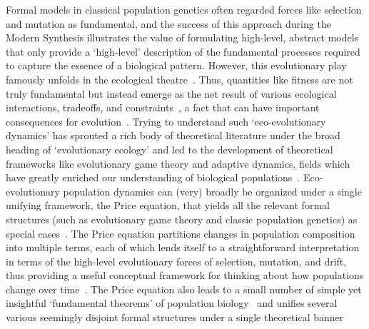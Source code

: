 Formal models in classical population genetics often regarded forces like selection and mutation as fundamental, and the success of this approach during the Modern Synthesis illustrates the value of formulating high-level, abstract models that only provide a `high-level' description of the fundamental processes required to capture the essence of a biological pattern. However, this evolutionary play famously unfolds in the ecological theatre~\citep{hutchinson_ecological_1965}. Thus, quantities like fitness are not truly fundamental but instead emerge as the net result of various ecological interactions, tradeoffs, and constraints~\citep{metz_how_1992}, a fact that can have important consequences for evolution~\citep{coulson_putting_2006, kokko_can_2017}. Trying to understand such `eco-evolutionary dynamics' has sprouted a rich body of theoretical literature under the broad heading of `evolutionary ecology' and led to the development of theoretical frameworks like evolutionary game theory and adaptive dynamics, fields which have greatly enriched our understanding of biological populations~\citep{brown_why_2016}. Eco-evolutionary population dynamics can (very) broadly be organized under a single unifying framework, the Price equation, that yields all the relevant formal structures (such as evolutionary game theory and classic population genetics) as special cases~\citep{page_unifying_2002, queller_fundamental_2017, lion_theoretical_2018}. The Price equation partitions changes in population composition into multiple terms, each of which lends itself to a straightforward interpretation in terms of the high-level evolutionary forces of selection, mutation, and drift, thus providing a useful conceptual framework for thinking about how populations change over time~\citep{frank_natural_2012}. The Price equation also leads to a small number of simple yet insightful `fundamental theorems' of population biology~\citep{queller_fundamental_2017, lion_theoretical_2018, lehtonen_price_2018} and unifies several various seemingly disjoint formal structures under a single theoretical banner~\citep{ lehtonen_price_2020, luque_mirror_2021}

